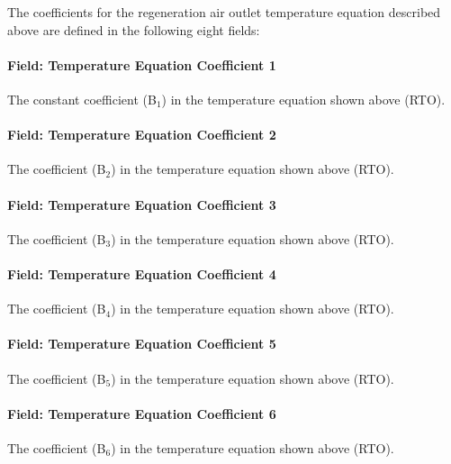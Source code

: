 The coefficients for the regeneration air outlet temperature equation described above are defined in the following eight fields:

\paragraph{Field: Temperature Equation Coefficient 1}\label{field-temperature-equation-coefficient-1}

The constant coefficient (B\(_{1}\)) in the temperature equation shown above (RTO).

\paragraph{Field: Temperature Equation Coefficient 2}\label{field-temperature-equation-coefficient-2}

The coefficient (B\(_{2}\)) in the temperature equation shown above (RTO).

\paragraph{Field: Temperature Equation Coefficient 3}\label{field-temperature-equation-coefficient-3}

The coefficient (B\(_{3}\)) in the temperature equation shown above (RTO).

\paragraph{Field: Temperature Equation Coefficient 4}\label{field-temperature-equation-coefficient-4}

The coefficient (B\(_{4}\)) in the temperature equation shown above (RTO).

\paragraph{Field: Temperature Equation Coefficient 5}\label{field-temperature-equation-coefficient-5}

The coefficient (B\(_{5}\)) in the temperature equation shown above (RTO).

\paragraph{Field: Temperature Equation Coefficient 6}\label{field-temperature-equation-coefficient-6}

The coefficient (B\(_{6}\)) in the temperature equation shown above (RTO).

